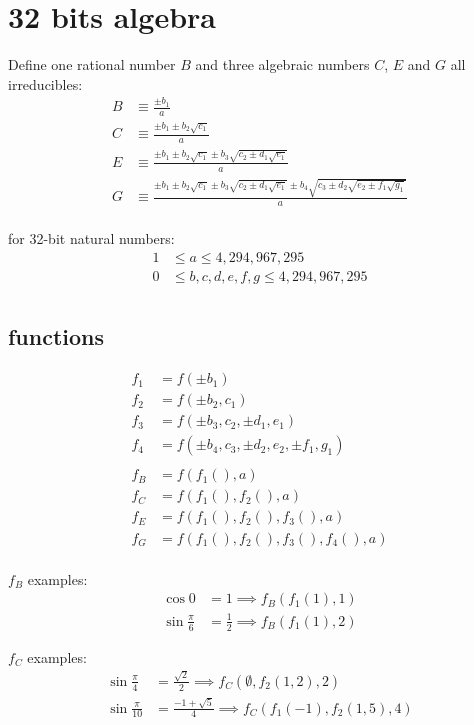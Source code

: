 \documentclass{article}
\begin{document}
\section{32 bits algebra}
Define one rational number $B$ and three algebraic numbers $C$, $E$ and $G$ all irreducibles:
\begin{align*}
B &\equiv \frac{\pm b_1}{a}\\
C &\equiv \frac{\pm b_1\pm b_2\sqrt{c_1}}{a}\\
E &\equiv \frac{\pm b_1\pm b_2\sqrt{c_1} \pm b_3\sqrt{c_2 \pm d_1\sqrt{e_1}}}{a}\\
G &\equiv \frac{\pm b_1\pm b_2\sqrt{c_1} \pm b_3\sqrt{c_2 \pm d_1\sqrt{e_1}} \pm b_4\sqrt{c_3 \pm d_2\sqrt{e_2 \pm f_1\sqrt{g_1}}}}{a}\\
\end{align*}

for 32-bit natural numbers:
\begin{align*}
1 &\leq a       \leq 4,294,967,295\\
0 &\leq b,c,d,e,f,g \leq 4,294,967,295\\
\end{align*}

\subsection{functions}
\begin{align*}
f_1 &= f(\pm b_1)\\
f_2 &= f(\pm b_2, c_1)\\
f_3 &= f(\pm b_3, c_2, \pm d_1, e_1)\\
f_4 &= f(\pm b_4, c_3, \pm d_2, e_2, \pm f_1, g_1)\\
\\
f_B &= f(f_1(), a)\\
f_C &= f(f_1(), f_2(), a)\\
f_E &= f(f_1(), f_2(), f_3(), a)\\
f_G &= f(f_1(), f_2(), f_3(), f_4(), a)\\
\end{align*}


$f_B$ examples:
\begin{align*}
\cos{0}             &= 1           \implies f_B(f_1(1),1)\\
\sin{\frac{\pi}{6}} &= \frac{1}{2} \implies f_B(f_1(1),2)
\end{align*}

$f_C$ examples:
\begin{align*}
\sin{\frac{\pi}{4}}  &= \frac{\sqrt{2}}{2}    \implies f_C(\emptyset,f_2(1,2),2)\\
\sin{\frac{\pi}{10}} &= \frac{-1+\sqrt{5}}{4} \implies f_C(f_1(-1),f_2(1,5),4)
\end{align*}
\end{document}
